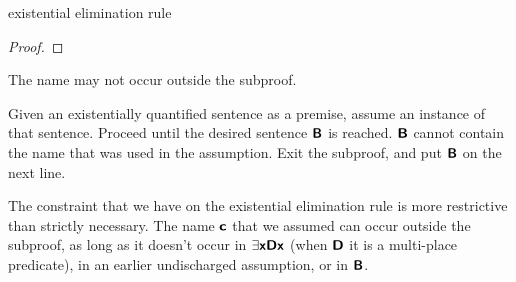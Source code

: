 	\begin{quote}
	\end{quote}

\begin{factboxy}{existential elimination rule}
\begin{proof}
	\open
		 \as{}
	\close
	 
\end{proof}

\small{The name  may not occur outside the subproof.\smallskip

Given an existentially quantified sentence as a premise, assume an instance of that sentence. Proceed until the desired sentence $\bm{\mathsf{B}}$ is reached. $\bm{\mathsf{B}}$ cannot contain the name that was used in the assumption. Exit the subproof, and put $\bm{\mathsf{B}}$ on the next line.
}
\end{factboxy}



\begin{notebox}
The constraint that we have on the existential elimination rule is more restrictive than strictly necessary. The name $\bm{\mathsf{c}}$ that we assumed can occur outside the subproof, as long as it doesn't occur in $\exists \bm{\mathsf{x}}\bm{\mathsf{Dx}}$ (when $\bm{\mathsf{D}}$ it is a multi-place predicate), in an earlier undischarged assumption, or in $\bm{\mathsf{B}}$.
\end{notebox}

